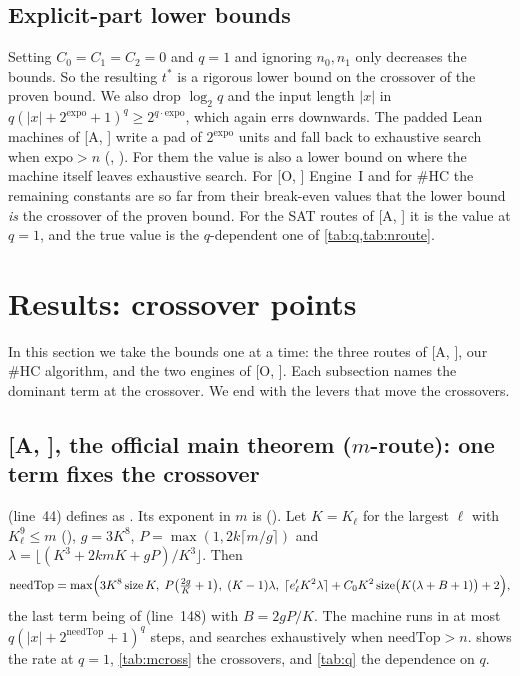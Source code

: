 \documentclass[10pt]{amsart}
\theoremstyle{definition}
\theoremstyle{remark}
\numberwithin{equation}{section}
\newcommand{\A}[1][]{\textup{[A\if\relax\detokenize{#1}\relax\else, #1\fi]}}
\newcommand{\Oa}[1][]{\textup{[O\if\relax\detokenize{#1}\relax\else, #1\fi]}}
\newcommand{\HC}{\#\mathrm{HC}}
\newcommand{\tst}{t^{*}}
\newcommand{\sz}{\operatorname{size}}
\begin{document}
\subsection{Explicit-part lower bounds}\label{sec:explicit}
Setting $C_0=C_1=C_2=0$ and $q=1$ and ignoring $n_0,n_1$ only decreases the bounds. So the
resulting $\tst$ is a rigorous lower bound on the crossover of the proven bound. We also drop
$\log_2q$ and the input length $|x|$ in $q(|x|+2^{\mathrm{expo}}+1)^q\ge2^{q\cdot\mathrm{expo}}$,
which again errs downwards. The padded Lean machines of \A{} write a pad of $2^{\mathrm{expo}}$
units and fall back to exhaustive search when $\mathrm{expo}>n$ (, ). For them
the value is also a lower bound on where the machine itself leaves exhaustive search. For \Oa{}
Engine~I and for $\HC$ the remaining constants are so far from their break-even values that the lower
bound \emph{is} the crossover of the proven bound. For the SAT routes of \A{} it is the value at
$q=1$, and the true value is the $q$-dependent one of \cref{tab:q,tab:nroute}.

\section{Results: crossover points}\label{sec:results}

In this section we take the bounds one at a time: the three routes of \A, our $\HC$ algorithm, and
the two engines of \Oa. Each subsection names the dominant term at the crossover. We end with the
levers that move the crossovers.

\subsection{\texorpdfstring{\A}{[A]}, the official main theorem (\texorpdfstring{$m$}{m}-route): one term fixes the crossover}\label{sec:mroute}
 (line~44) defines  as
. Its exponent in $m$ is 
(). Let $K=K_\ell$ for the largest $\ell$ with $K_\ell^9\le m$
(), $g=3K^8$, $P=\max(1,2k\lceil m/g\rceil)$ and $\lambda=\lfloor(K^3+2kmK+gP)/K^3\rfloor$.
Then
\begin{equation}\label{eq:needTop}
\mathrm{needTop}=\max\Bigl(3K^8\sz K,\;P\bigl(\tfrac{2g}{K}+1\bigr),\;(K-1)\lambda,\;
\lceil e'_\ell K^2\lambda\rceil+C_0K^2\sz\bigl(K(\lambda+B+1)\bigr)+2\Bigr),
\end{equation}
the last term being  of  (line~148) with
$B=2gP/K$. The machine runs in at most $q(|x|+2^{\mathrm{needTop}}+1)^q$ steps, and searches
exhaustively when $\mathrm{needTop}>n$.  shows the rate at $q=1$, \cref{tab:mcross}
the crossovers, and \cref{tab:q} the dependence on $q$.
\end{document}
